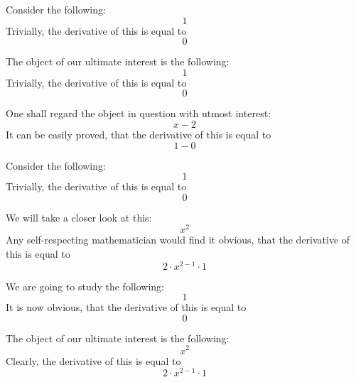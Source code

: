 \documentclass{article}
\begin{document}
Consider the following:
\begin{equation}
1 
\end{equation}
Trivially, the derivative of this is equal to
\begin{equation}
0 
\end{equation}

The object of our ultimate interest is the following:
\begin{equation}
1 
\end{equation}
Trivially, the derivative of this is equal to
\begin{equation}
0 
\end{equation}

One shall regard the object in question with utmost interest:
\begin{equation}
x - 2 
\end{equation}
It can be easily proved, that the derivative of this is equal to
\begin{equation}
1 - 0 
\end{equation}

Consider the following:
\begin{equation}
1 
\end{equation}
Trivially, the derivative of this is equal to
\begin{equation}
0 
\end{equation}

We will take a closer look at this:
\begin{equation}
x ^{2 } 
\end{equation}
Any self-respecting mathematician would find it obvious, that the derivative of this is equal to
\begin{equation}
2 \cdot x ^{2 - 1 } \cdot 1 
\end{equation}

We are going to study the following:
\begin{equation}
1 
\end{equation}
It is now obvious, that the derivative of this is equal to
\begin{equation}
0 
\end{equation}

The object of our ultimate interest is the following:
\begin{equation}
x ^{2 } 
\end{equation}
Clearly, the derivative of this is equal to
\begin{equation}
2 \cdot x ^{2 - 1 } \cdot 1 
\end{equation}
\end{document}

